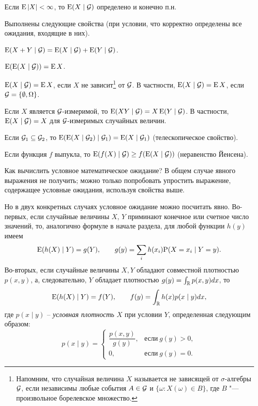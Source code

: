 \begin{proposition}
Если $\operatorname{E}|X|<\infty$, то $\operatorname{E}(X\mid \mathcal{G})$ определено и конечно п.н.
\end{proposition}

\begin{proposition}
Выполнены следующие свойства (при условии, что корректно определены все ожидания, входящие в них).

\begin{alphenum}
\item $\operatorname{E}(X + Y \mid \mathcal{G}) = \operatorname{E}(X\mid \mathcal{G}) + \operatorname{E}(Y\mid \mathcal{G})$.

\item $\operatorname{E}(\operatorname{E}(X\mid \mathcal{G})) = \operatorname{E} X$.

\item $\operatorname{E}(X\mid\mathcal{G}) = \operatorname{E} X$, если $X$ не зависит\footnote{Напомним, что случайная величина $X$ называется не зависящей от $\sigma$-алгебры $\mathcal{G}$, если независимы любые события $A\in \mathcal{G}$ и $\{\omega: X(\omega)\in B\}$, где $B$ "--- произвольное борелевское множество.} от $\mathcal{G}$.
В частности, $\operatorname{E}(X\mid\mathcal{G}) = \operatorname{E} X$, если $\mathcal{G}=\{\emptyset, \Omega\}$.

\item Если $X$ является $\mathcal{G}$-измеримой, то $\operatorname{E}(XY\mid \mathcal{G}) = X\operatorname{E}(Y\mid \mathcal{G})$.
В частности, $\operatorname{E}(X\mid \mathcal{G}) = X$ для $\mathcal{G}$-измеримых случайных величин.

\item Если $\mathcal{G}_1 \subseteq \mathcal{G}_2$, то $\operatorname{E}(\operatorname{E}(X\mid \mathcal{G}_2) \mid \mathcal{G}_1) = \operatorname{E}(X\mid \mathcal{G}_1)$ (телескопическое свойство). 

\item Если функция $f$ выпукла, то $\operatorname{E}(f(X)\mid \mathcal{G}) \ge f(\operatorname{E}(X\mid \mathcal{G}))$ (неравенство Йенсена).
\end{alphenum}
\end{proposition}

\begin{remark}
Как вычислить условное математическое ожидание?
В общем случае явного выражения не получить; можно только попробовать упростить выражение, содержащее условные ожидания, используя свойства выше.

Но в двух конкретных случаях условное ожидание можно посчитать явно.
Во-первых, если случайные величины $X$, $Y$ приминают конечное или счетное число значений, то, аналогично формуле в начале раздела, для любой функции $h(y)$ имеем
\[
\operatorname{E}(h(X)\mid Y) = g(Y), \qquad g(y) = \sum_i h(x_i)\mathrm{P}(X=x_i\mid Y=y).
\] 
Во-вторых, если случайные величины $X,Y$ обладают совместной плотностью $p(x,y)$, а, следовательно, $Y$ обладает плотностью $g(y) = \int_{\mathbb{R}} p(x,y) dx$, то
\[
\operatorname{E}(h(X)\mid Y) = f(Y), \qquad f(y) = \int_{\mathbb{R}} h(x) p(x\mid y) dx,
\]
где $p(x\mid y)$ -- \emph{условная плотность} $X$ при условии $Y$, определенная следующим образом:
\[
p(x\mid y) =
\begin{cases}
\dfrac{p(x,y)}{g(y)}, &\text{если}\ g(y)>0,\\
0,                    &\text{если}\ g(y)=0.
\end{cases}
\]
\end{remark}


